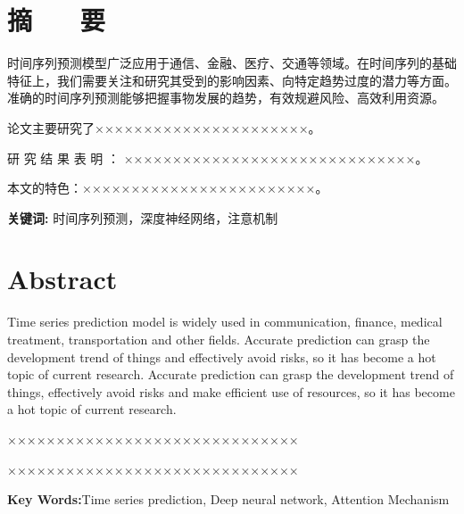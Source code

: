 \section*{\heiti {} \centering 摘 ~~ 要}

\vskip0.5cm
时间序列预测模型广泛应用于通信、金融、医疗、交通等领域。在时间序列的基础特征上，我们需要关注和研究其受到的影响因素、向特定趋势过度的潜力等方面。准确的时间序列预测能够把握事物发展的趋势，有效规避风险、高效利用资源。

论文主要研究了××××××××××××××××××××××。 

研 究 结 果 表 明 ： ××××××××××××××××××××××××××××××。 

本文的特色：××××××××××××××××××××××××。



\textbf{\heiti {} 关键词:}  时间序列预测，深度神经网络，注意机制

\clearpage


\section*{ \centering \textbf{Abstract} }

Time series prediction model is widely used in communication, finance, medical treatment, transportation and other fields. Accurate prediction can grasp the development trend of things and effectively avoid risks, so it has become a hot topic of current research. Accurate prediction can grasp the development trend of things, effectively avoid risks and make efficient use of resources, so it has become a hot topic of current research.

××××××××××××××××××××××××××××××

××××××××××××××××××××××××××××××

\textbf{ Key Words:}Time series prediction, Deep neural network, Attention Mechanism
